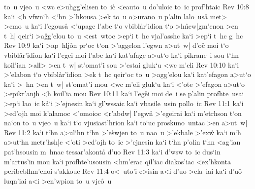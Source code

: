 to~u
vjeo~u
<wc
e>uhgg'elisen
to~ic\r{}
<eauto~u
do'uloic
to~ic
prof'htaic\bibvsend
\vs Rev 10:8
ka`i
<h
vfwn`h
<`hn
>'hkousa
>ek
to~u
o>urano~u
p'alin
lalo~us\r{a}
met>
>emo~u
ka`i
l'egous\r{a}
<'upage
l'abe
t`o
vbibl\r{a}r'idion
t`o
>h\r{n}ew|gm'enon
>en
t~h|
qeir`i
>a\r{g}g'elou
to~u
<est~wtoc
>ep`i
t~hc
vjal'asshc
ka`i
>ep`i
t~hc
g~hc\bibvsend
\vs Rev 10:9
ka`i
>ap~hlj\r{o}n
pr`oc
t`on
>'aggelon
l'egwn
a>ut~w|
d'o\r{c}
moi
t`o
vbibl\r{a}r'idion
ka`i
l'egei
moi
l'abe
ka`i
kat'afage
a>ut`o
ka`i
pikrane~i
sou
t`hn
koil'ian
>all>
>en
t~w|
st'omat'i
sou
>'estai
gluk`u
<wc
m'eli\bibvsend
\vs Rev 10:10
ka`i
>'elabon
t`o
vbibl\r{a}r'idion
>ek
t~hc
qeir`oc
to~u
>agg'elou
ka`i
kat'efagon
a>ut`o
ka`i
>~hn
>en
t~w|
st'omat'i
mou
<wc
m'eli
gluk`u
ka`i
<'ote
>'efagon
a>ut`o
>epikr'anjh
<h
koil'ia
mou\bibvsend
\vs Rev 10:11
ka`i
l'eg\r{e}i
moi
de~i
se
p'alin
profhte~usai
>ep`i
lao~ic
k\r{a}`i
>'ejnesin
ka`i
gl'wssaic
ka`i
vbasile~usin
pollo~ic\bibvsend
\vs Rev 11:1
ka`i
>ed'ojh
moi
k'alamoc
<'omoioc
<r'abdw|
l'egwn\r{}
>'egeirai
ka`i
m'etrhson
t`on
na`on
to~u
vjeo~u
ka`i
t`o
vjusiast'hrion
ka`i
to`uc
proskuno~untac
>en
a>ut~w|\bibvsend
\vs Rev 11:2
ka`i
t`hn
a>ul`hn
t`hn
>'e\r{s}wjen
to~u
nao~u
>'ekbale
>'ex\r{w}
ka`i
m`h
a>ut`hn
metr'hsh|c
<'oti
>ed'ojh
to~ic
>'ejnesin
ka`i
t`hn
p'olin
t`hn
<ag'ian
pat'hsousin
m~hnac
tessar'akonta\r{}
d'uo\bibvsend
\vs Rev 11:3
ka`i
d'wsw
to~ic
dus`in
m'artus'in
mou
ka`i
profhte'usousin
<hm'erac
qil'iac
diakos'iac
<ex'hkonta
peribeblhm'enoi
s'akkouc\bibvsend
\vs Rev 11:4
o<~uto'i
e>isin
a<i
d'uo
>ela~iai
ka`i
d'u\r{o}
luqn'iai
a<i
>en'wpion
to~u
vje\r{o}~u
